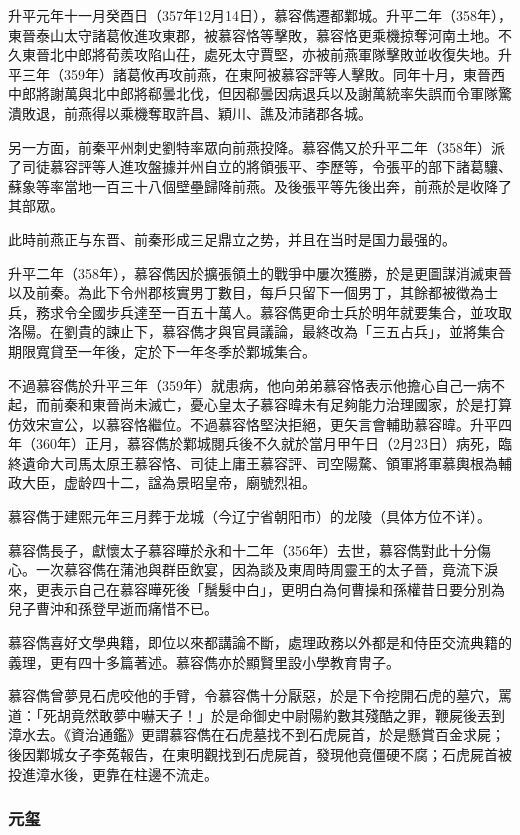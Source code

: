 升平元年十一月癸酉日（357年12月14日），慕容儁遷都鄴城。升平二年（358年），東晉泰山太守諸葛攸進攻東郡，被慕容恪等擊敗，慕容恪更乘機掠奪河南土地。不久東晉北中郎將荀羨攻陷山茌，處死太守賈堅，亦被前燕軍隊擊敗並收復失地。升平三年（359年）諸葛攸再攻前燕，在東阿被慕容評等人擊敗。同年十月，東晉西中郎將謝萬與北中郎將郗曇北伐，但因郗曇因病退兵以及謝萬統率失誤而令軍隊驚潰敗退，前燕得以乘機奪取許昌、穎川、譙及沛諸郡各城。

另一方面，前秦平州刺史劉特率眾向前燕投降。慕容儁又於升平二年（358年）派了司徒慕容評等人進攻盤據并州自立的將領張平、李歷等，令張平的部下諸葛驤、蘇象等率當地一百三十八個壁壘歸降前燕。及後張平等先後出奔，前燕於是收降了其部眾。

此時前燕正与东晋、前秦形成三足鼎立之势，并且在当时是国力最强的。

升平二年（358年），慕容儁因於擴張領土的戰爭中屢次獲勝，於是更圖謀消滅東晉以及前秦。為此下令州郡核實男丁數目，每戶只留下一個男丁，其餘都被徴為士兵，務求令全國步兵達至一百五十萬人。慕容儁更命士兵於明年就要集合，並攻取洛陽。在劉貴的諫止下，慕容儁才與官員議論，最終改為「三五占兵」，並將集合期限寬貸至一年後，定於下一年冬季於鄴城集合。

不過慕容儁於升平三年（359年）就患病，他向弟弟慕容恪表示他擔心自己一病不起，而前秦和東晉尚未滅亡，憂心皇太子慕容暐未有足夠能力治理國家，於是打算仿效宋宣公，以慕容恪繼位。不過慕容恪堅決拒絕，更矢言會輔助慕容暐。升平四年（360年）正月，慕容儁於鄴城閱兵後不久就於當月甲午日（2月23日）病死，臨終遺命大司馬太原王慕容恪、司徒上庸王慕容評、司空陽騖、領軍將軍慕輿根為輔政大臣，虚龄四十二，諡為景昭皇帝，廟號烈祖。

慕容儁于建熙元年三月葬于龙城（今辽宁省朝阳市）的龙陵（具体方位不详）。

慕容儁長子，獻懷太子慕容曄於永和十二年（356年）去世，慕容儁對此十分傷心。一次慕容儁在蒲池與群臣飲宴，因為談及東周時周靈王的太子晉，竟流下淚來，更表示自己在慕容曄死後「鬚髮中白」，更明白為何曹操和孫權昔日要分別為兒子曹沖和孫登早逝而痛惜不已。

慕容儁喜好文學典籍，即位以來都講論不斷，處理政務以外都是和侍臣交流典籍的義理，更有四十多篇著述。慕容儁亦於顯賢里設小學教育冑子。

慕容儁曾夢見石虎咬他的手臂，令慕容儁十分厭惡，於是下令挖開石虎的墓穴，罵道：「死胡竟然敢夢中嚇天子！」於是命御史中尉陽約數其殘酷之罪，鞭屍後丟到漳水去。《資治通鑑》更謂慕容儁在石虎墓找不到石虎屍首，於是懸賞百金求屍；後因鄴城女子李菟報告，在東明觀找到石虎屍首，發現他竟僵硬不腐；石虎屍首被投進漳水後，更靠在柱邊不流走。

\subsubsection{元玺}

